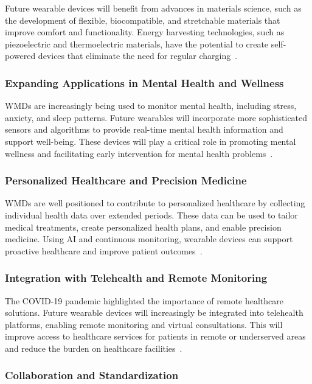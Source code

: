 \documentclass[journal]{IEEEtran}
\begin{document}
        Future wearable devices will benefit from advances in materials science, such as the development of flexible, biocompatible, and stretchable materials that improve comfort and functionality. Energy harvesting technologies, such as piezoelectric and thermoelectric materials, have the potential to create self-powered devices that eliminate the need for regular charging~\cite{Pantrangi2024}.

        \subsubsection{Expanding Applications in Mental Health and Wellness}

        WMDs are increasingly being used to monitor mental health, including stress, anxiety, and sleep patterns. Future wearables will incorporate more sophisticated sensors and algorithms to provide real-time mental health information and support well-being. These devices will play a critical role in promoting mental wellness and facilitating early intervention for mental health problems~\cite{Iqbal2016}.

        \subsubsection{Personalized Healthcare and Precision Medicine}

        WMDs are well positioned to contribute to personalized healthcare by collecting individual health data over extended periods. These data can be used to tailor medical treatments, create personalized health plans, and enable precision medicine. Using AI and continuous monitoring, wearable devices can support proactive healthcare and improve patient outcomes~\cite{Cusack2024}.

        \subsubsection{Integration with Telehealth and Remote Monitoring}

        The COVID-19 pandemic highlighted the importance of remote healthcare solutions. Future wearable devices will increasingly be integrated into telehealth platforms, enabling remote monitoring and virtual consultations. This will improve access to healthcare services for patients in remote or underserved areas and reduce the burden on healthcare facilities~\cite{Nahavandi2022, Cusack2024}.

        \subsubsection{Collaboration and Standardization}
\end{document}
